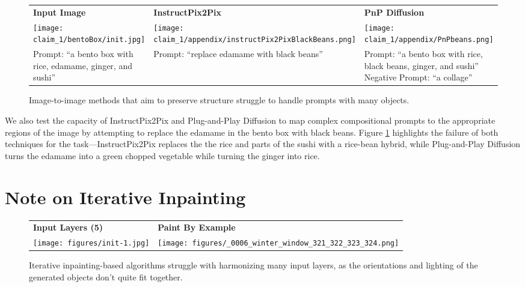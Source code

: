 \begin{figure}[!htbp]
    \centering
    \begin{adjustbox}{max size={\textwidth}{\textheight}}
    \begin{tabular}[t]{p{.33\linewidth}p{.33\linewidth}p{.33\linewidth}}
        \hfil\textbf{Input Image} & \hfil\textbf{InstructPix2Pix} & \hfil\textbf{PnP Diffusion} \\
        \texttt{[image: claim\_1/bentoBox/init.jpg]} & \texttt{[image: claim\_1/appendix/instructPix2PixBlackBeans.png]} & \texttt{[image: claim\_1/appendix/PnPbeans.png]} \\
        Prompt: ``a bento box with rice, edamame, ginger, and sushi'' & Prompt: ``replace edamame with black beans'' & Prompt: ``a bento box with rice, black beans, ginger, and sushi'' \newline Negative Prompt: ``a collage'' \\
    \end{tabular}
    \end{adjustbox}
    \caption{Image-to-image methods that aim to preserve structure struggle to handle prompts with many objects. }
    \label{fig:PnPCA}
\end{figure}

We also test the capacity of InstructPix2Pix and Plug-and-Play Diffusion to map complex compositional prompts to the appropriate regions of the image by attempting to replace the edamame in the bento box with black beans.
Figure \ref{fig:PnPCA} highlights the failure of both techniques for the task---InstructPix2Pix replaces the the rice and parts of the sushi with a rice-bean hybrid, while Plug-and-Play Diffusion turns the edamame into a green chopped vegetable while turning the ginger into rice. 

\section{Note on Iterative Inpainting}

\begin{figure}[!htbp]
    \centering
    \begin{adjustbox}{max size={\textwidth}{\textheight}}
    \begin{tabular}[t]{p{.4\linewidth}p{.4\linewidth}}
        \hfil\textbf{Input Layers (5)} & \hfil\textbf{Paint By Example} \\
        \texttt{[image: figures/init-1.jpg]} & \texttt{[image: figures/\_0006\_winter\_window\_321\_322\_323\_324.png]} \\
    \end{tabular}
    \end{adjustbox}
    \vspace{0.5em}
    \caption{Iterative inpainting-based algorithms struggle with harmonizing many input layers, as the orientations and lighting of the generated objects don't quite fit together. }
    \vspace{-0.5em}
    \label{fig:byExample}
\end{figure}

